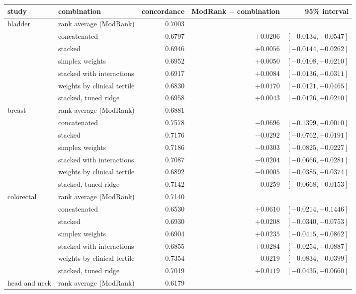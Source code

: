 \documentclass[11pt]{article}
\begin{document}
\begin{table}[h]
\centering
{\small
\setlength{\tabcolsep}{4pt}
\begin{tabular}{llrrr}
\toprule
study & combination & concordance & ModRank $-$ combination & 95\% interval \\
\midrule
bladder & rank average (ModRank) & 0.7003 & & \\
 & concatenated & 0.6797 & $+0.0206$ & $[-0.0134, +0.0547]$ \\
 & stacked & 0.6946 & $+0.0056$ & $[-0.0144, +0.0262]$ \\
 & simplex weights & 0.6952 & $+0.0050$ & $[-0.0108, +0.0210]$ \\
 & stacked with interactions & 0.6917 & $+0.0084$ & $[-0.0136, +0.0311]$ \\
 & weights by clinical tertile & 0.6830 & $+0.0170$ & $[-0.0121, +0.0465]$ \\
 & stacked, tuned ridge & 0.6958 & $+0.0043$ & $[-0.0126, +0.0210]$ \\
\addlinespace
breast & rank average (ModRank) & 0.6881 & & \\
 & concatenated & 0.7578 & $-0.0696$ & $[-0.1399, +0.0010]$ \\
 & stacked & 0.7176 & $-0.0292$ & $[-0.0762, +0.0191]$ \\
 & simplex weights & 0.7186 & $-0.0303$ & $[-0.0825, +0.0227]$ \\
 & stacked with interactions & 0.7087 & $-0.0204$ & $[-0.0666, +0.0281]$ \\
 & weights by clinical tertile & 0.6892 & $-0.0005$ & $[-0.0385, +0.0374]$ \\
 & stacked, tuned ridge & 0.7142 & $-0.0259$ & $[-0.0668, +0.0153]$ \\
\addlinespace
colorectal & rank average (ModRank) & 0.7140 & & \\
 & concatenated & 0.6530 & $+0.0610$ & $[-0.0214, +0.1446]$ \\
 & stacked & 0.6930 & $+0.0208$ & $[-0.0340, +0.0753]$ \\
 & simplex weights & 0.6904 & $+0.0235$ & $[-0.0415, +0.0862]$ \\
 & stacked with interactions & 0.6855 & $+0.0284$ & $[-0.0254, +0.0887]$ \\
 & weights by clinical tertile & 0.7354 & $-0.0219$ & $[-0.0834, +0.0399]$ \\
 & stacked, tuned ridge & 0.7019 & $+0.0119$ & $[-0.0435, +0.0660]$ \\
\addlinespace
head and neck & rank average (ModRank) & 0.6179 & & \\

\end{tabular}}
\end{table}
\end{document}
